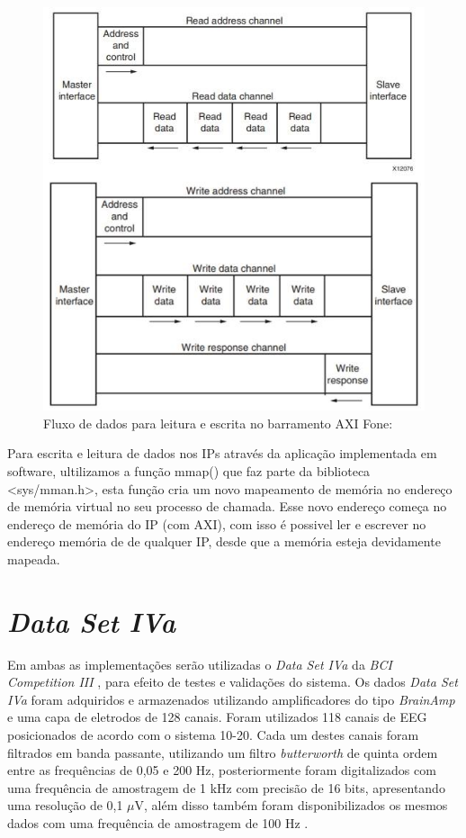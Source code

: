 \begin{figure}[h]
	\centering
	\includegraphics[keepaspectratio=true,scale=0.5]{figuras/axi_bus.png}
	\caption{Fluxo de dados para leitura e escrita no barramento AXI Fone: \cite{user-guide-axi}}
	\label{axi_bus}
\end{figure}

Para escrita e leitura de dados nos IPs através da aplicação implementada em software, ultilizamos a função mmap() que faz parte da biblioteca <sys/mman.h>, esta função cria um novo mapeamento de memória no endereço de memória virtual no seu processo de chamada. Esse novo endereço começa no endereço de memória do IP (com AXI), com isso é possivel ler e escrever no endereço memória de de qualquer IP, desde que a memória esteja devidamente mapeada. 

\section{\textit{Data Set IVa}}

Em ambas as implementações serão utilizadas o \textit{Data Set IVa} da \textit{BCI Competition III} \cite{BCICompetition}, para efeito de testes e validações do sistema.
Os dados \textit{Data Set IVa} foram adquiridos e armazenados utilizando amplificadores do tipo \textit{BrainAmp} e uma capa de eletrodos de 128 canais. Foram utilizados 118 canais de EEG posicionados de acordo com o sistema 10-20. Cada um destes canais foram filtrados em banda passante, utilizando um filtro \textit{butterworth} de quinta ordem entre as frequências de 0,05 e 200 Hz, posteriormente foram digitalizados com uma frequência de amostragem de 1 kHz com precisão de 16 bits, apresentando uma resolução de 0,1 $\mu$V, além disso também foram disponibilizados os mesmos dados com uma frequência de amostragem de 100 Hz \cite{siteBCI}.
\vspace{\onelineskip}

